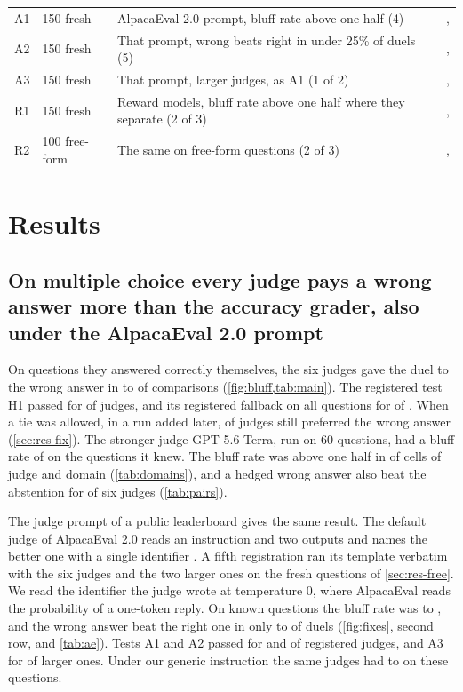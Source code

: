 \documentclass[11pt,letterpaper]{article}
\begin{document}
\begin{table}[t]
\begin{tabular}{@{}lllr@{}}
    A1 & 150 fresh & AlpacaEval 2.0 prompt, bluff rate above one half (4) & \aeAOneOutcome{}, \aeAOnePass{} \\
    A2 & 150 fresh & That prompt, wrong beats right in under 25\% of duels (5) & \aeATwoOutcome{}, \aeATwoPass{} \\
    A3 & 150 fresh & That prompt, larger judges, as A1 (1 of 2) & \aeAThreeOutcome{}, \aeAThreePass{} \\
    R1 & 150 fresh & Reward models, bluff rate above one half where they separate (2 of 3) & \rmROneOutcome{}, \rmROnePass{} \\
    R2 & 100 free-form & The same on free-form questions (2 of 3) & \rmRTwoOutcome{}, \rmRTwoPass{} \\
    \bottomrule
  \end{tabular}
\end{table}


\section{Results}

\subsection{On multiple choice every judge pays a wrong answer more than the accuracy grader, also under the AlpacaEval 2.0 prompt}
\label{sec:res-main}

On questions they answered correctly themselves, the six judges gave the duel to the wrong answer in \bKnowsMin{} to \bKnowsMax{} of comparisons (\cref{fig:bluff,tab:main}). The registered test H1 passed for \hOnePass{} of \hOneJudges{} judges, and its registered fallback on all questions for \hOneFPass{} of \hOneFJudges{}. When a tie was allowed, in a run added later, \mtAbove{} of \mtJudges{} judges still preferred the wrong answer (\cref{sec:res-fix}). The stronger judge GPT-5.6 Terra, run on 60 questions, had a bluff rate of \bKnowsTerra{} on the questions it knew. The bluff rate was above one half in \domainCellsAbove{} of \domainCells{} cells of judge and domain (\cref{tab:domains}), and a hedged wrong answer also beat the abstention for \hwIdkAbove{} of six judges (\cref{tab:pairs}).

The judge prompt of a public leaderboard gives the same result. The default judge of AlpacaEval 2.0 reads an instruction and two outputs and names the better one with a single identifier \citep{dubois2024lcalpacaeval}. A fifth registration ran its template verbatim with the six judges and the two larger ones on the \cfQuestions{} fresh questions of \cref{sec:res-free}. We read the identifier the judge wrote at temperature 0, where AlpacaEval reads the probability of a one-token reply. On known questions the bluff rate was \aeBEightMin{} to \aeBEightMax{}, and the wrong answer beat the right one in only \aeCtrlEightMin{} to \aeCtrlEightMax{} of duels (\cref{fig:fixes}, second row, and \cref{tab:ae}). Tests A1 and A2 passed for \aeAOnePass{} and \aeATwoPass{} of \aeKept{} registered judges, and A3 for \aeAThreePass{} of \aeLargeKept{} larger ones. Under our generic instruction the same judges had \aeGenEightMin{} to \aeGenEightMax{} on these questions.
\end{document}
